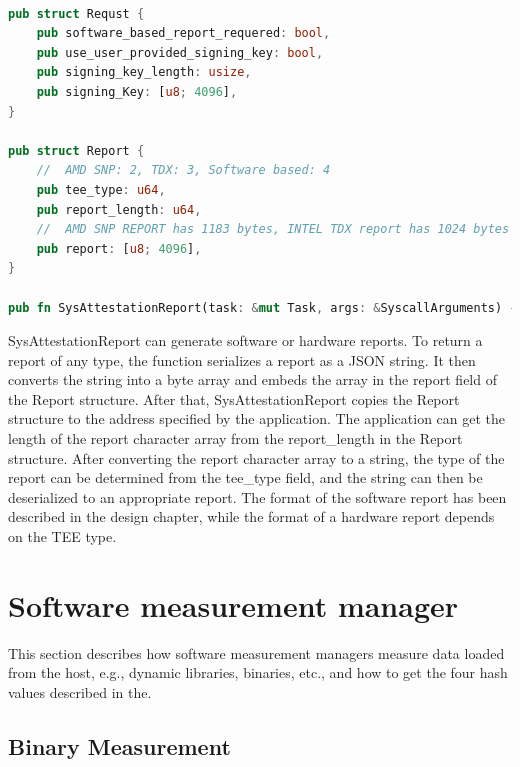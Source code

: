 \begin{lstlisting}[language=rust, caption= Interface for accessing the file type secrets, label={lst:runtime_attestation}]

pub struct Requst {
    pub software_based_report_requered: bool,
    pub use_user_provided_signing_key: bool,
    pub signing_key_length: usize, 
    pub signing_Key: [u8; 4096],  
}

pub struct Report {
    //  AMD SNP: 2, TDX: 3, Software based: 4
    pub tee_type: u64,
    pub report_length: u64,
    //  AMD SNP REPORT has 1183 bytes, INTEL TDX report has 1024 bytes
    pub report: [u8; 4096],  
}

pub fn SysAttestationReport(task: &mut Task, args: &SyscallArguments) -> Result<i64>      
\end{lstlisting}

SysAttestationReport can generate software or hardware reports. To return a report of any type, the function serializes a report as a JSON string. It then converts the string into a byte array and embeds the array in the report field of the Report structure. After that, SysAttestationReport copies 
the Report structure to the address specified by the application. The application can get the length of the report character array from the report\_length in the Report structure. After converting the report character array to a string, the type of the report can be determined from the tee\_type field, 
and the string can then be deserialized to an appropriate report. The format of the software report has been described in the design chapter, while the format of a hardware report depends on the TEE type.

\section{Software measurement manager}
This section describes how software measurement managers measure data loaded from the host, e.g., dynamic libraries, binaries, etc., and how to get the four hash values described in the.

\subsection{Binary Measurement}


